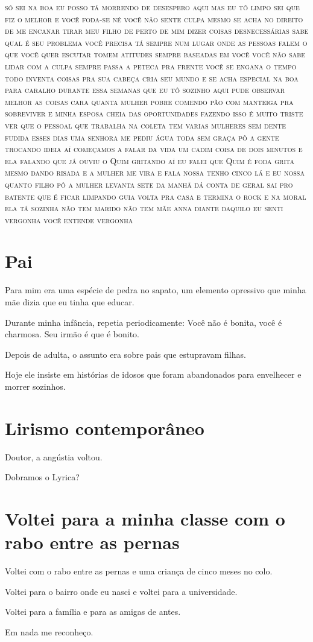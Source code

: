 \textsc{só sei na boa eu posso tá morrendo de desespero aqui mas eu tô
limpo sei que fiz o melhor e você foda-se né você não sente culpa
mesmo se acha no direito de me encanar tirar meu filho de perto de mim
dizer coisas desnecessárias sabe qual é seu problema você precisa tá
sempre num lugar onde as pessoas falem o que você quer escutar tomem
atitudes sempre baseadas em você você não sabe lidar com a culpa sempre
passa a peteca pra frente você se engana o tempo todo inventa coisas pra
sua cabeça cria seu mundo e se acha especial na boa para caralho durante
essa semanas que eu tô sozinho aqui pude observar melhor as coisas cara
quanta mulher pobre comendo pão com manteiga pra sobreviver e minha
esposa cheia das oportunidades fazendo isso é muito triste ver que o
pessoal que trabalha na coleta tem varias mulheres sem dente fudida
esses dias uma senhora me pediu água toda sem graça pô a gente trocando
ideia aí começamos a falar da vida um cadim coisa de dois minutos e ela
falando que já ouviu o Quim gritando aí eu falei que Quim é foda grita
mesmo dando risada e a mulher me vira e fala nossa tenho cinco lá e eu
nossa quanto filho pô a mulher levanta sete da manhã dá conta de geral
sai pro batente que é ficar limpando guia volta pra casa e termina o
rock e na moral ela tá sozinha não tem marido não tem mãe anna diante
daquilo eu senti vergonha você entende vergonha }

\chapter{Pai}

Para mim era uma espécie de pedra no sapato, um elemento opressivo que
minha mãe dizia que eu tinha que educar.

Durante minha infância, repetia periodicamente: Você não é bonita, você
é charmosa. Seu irmão é que é bonito.

Depois de adulta, o assunto era sobre pais que estupravam filhas.

Hoje ele insiste em histórias de idosos que foram abandonados para
envelhecer e morrer sozinhos.


\chapter{Lirismo contemporâneo}\label{lirismo-contemporuxe2neo}

{\parindent0pt\parskip1pt\raggedright
{\noindent
Doutor, a angústia voltou.

Dobramos o Lyrica?}


\chapter{Voltei para a minha classe com o rabo entre as pernas}

Voltei com o rabo entre as pernas e uma criança de cinco meses no colo.

Voltei para o bairro onde eu nasci e voltei para a universidade.

Voltei para a família e para as amigas de antes.

Em nada me reconheço.}

